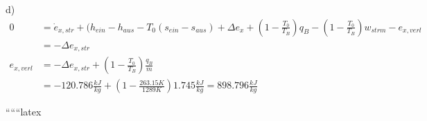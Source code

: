 d)
\begin{align*}
0 &= \dot{e}_{x,str} + (h_{ein} - h_{aus} - T_0 (s_{ein} - s_{aus}) + \Delta e_{x} + \left( 1 - \frac{T_0}{T_B} \right) q_B - \left( 1 - \frac{T_0}{T_B} \right) w_{strm} - e_{x,verl} \\
&= -\Delta e_{x,str} \\
e_{x,verl} &= -\Delta e_{x,str} + \left( 1 - \frac{T_0}{T_B} \right) \frac{q_B}{\dot{m}} \\
&= -120.786 \frac{kJ}{kg} + \left( 1 - \frac{263.15 K}{1289 K} \right) 1.745 \frac{kJ}{kg} = 898.796 \frac{kJ}{kg}
\end{align*}

``````latex